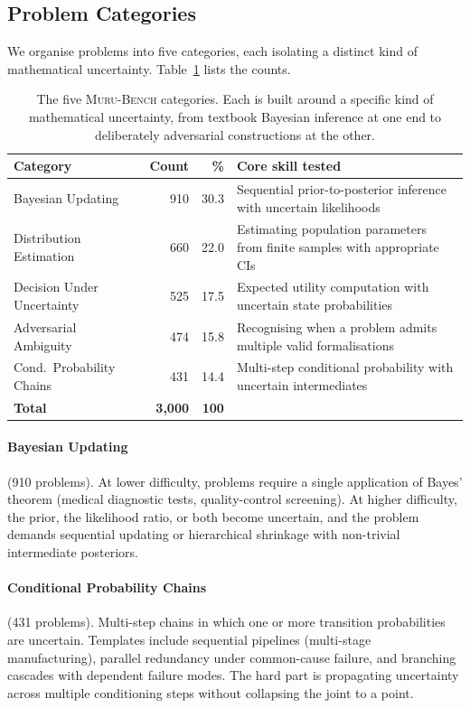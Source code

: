 \documentclass{article}
\newcommand{\muru}{\textsc{Muru-Bench}}
\begin{document}
\subsection{Problem Categories}
\label{sec:categories}

We organise problems into five categories, each isolating a distinct kind of mathematical uncertainty. Table~\ref{tab:categories} lists the counts.

\begin{table}[t]
\centering
\caption{The five \muru{} categories. Each is built around a specific kind of mathematical uncertainty, from textbook Bayesian inference at one end to deliberately adversarial constructions at the other.}
\label{tab:categories}
\begin{tabular}{lrrp{5.5cm}}
\toprule
\textbf{Category} & \textbf{Count} & \textbf{\%} & \textbf{Core skill tested} \\
\midrule
Bayesian Updating & 910 & 30.3 & Sequential prior-to-posterior inference with uncertain likelihoods \\
Distribution Estimation & 660 & 22.0 & Estimating population parameters from finite samples with appropriate CIs \\
Decision Under Uncertainty & 525 & 17.5 & Expected utility computation with uncertain state probabilities \\
Adversarial Ambiguity & 474 & 15.8 & Recognising when a problem admits multiple valid formalisations \\
Cond.\ Probability Chains & 431 & 14.4 & Multi-step conditional probability with uncertain intermediates \\
\midrule
\textbf{Total} & \textbf{3{,}000} & \textbf{100} & \\
\bottomrule
\end{tabular}
\end{table}

\paragraph{Bayesian Updating} (910 problems). At lower difficulty, problems require a single application of Bayes' theorem (medical diagnostic tests, quality-control screening). At higher difficulty, the prior, the likelihood ratio, or both become uncertain, and the problem demands sequential updating or hierarchical shrinkage with non-trivial intermediate posteriors.

\paragraph{Conditional Probability Chains} (431 problems). Multi-step chains in which one or more transition probabilities are uncertain. Templates include sequential pipelines (multi-stage manufacturing), parallel redundancy under common-cause failure, and branching cascades with dependent failure modes. The hard part is propagating uncertainty across multiple conditioning steps without collapsing the joint to a point.
\end{document}
